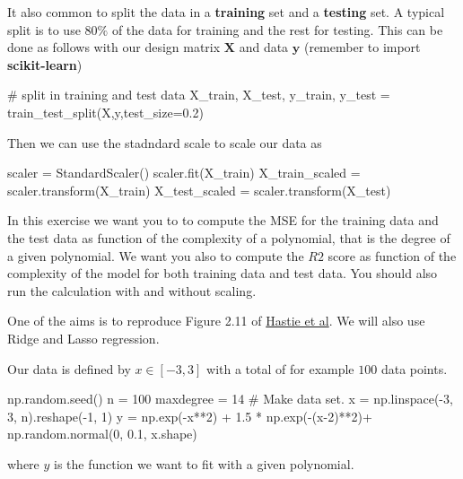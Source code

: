 \documentclass[%
oneside,                 %
final,                   %
10pt]{article}
\begin{document}
It also common to split the data in a \textbf{training} set and a \textbf{testing} set. A typical split is to use $80\%$ of the data for training and the rest
for testing. This can be done as follows with our design matrix $\bm{X}$ and data $\bm{y}$ (remember to import \textbf{scikit-learn})
\begin{print}
# split in training and test data
X_train, X_test, y_train, y_test = train_test_split(X,y,test_size=0.2)
\end{print}
Then we can use the stadndard scale to scale our data as
\begin{print}
scaler = StandardScaler()
scaler.fit(X_train)
X_train_scaled = scaler.transform(X_train)
X_test_scaled = scaler.transform(X_test)
\end{print}


In this exercise we want you to to compute the MSE for the training
data and the test data as function of the complexity of a polynomial,
that is the degree of a given polynomial. We want you also to compute the $R2$ score as function of the complexity of the model for both training data and test data.  You should also run the calculation with and without scaling. 

One of 
the aims is to reproduce Figure 2.11 of \href{{https://github.com/CompPhysics/MLErasmus/blob/master/doc/Textbooks/elementsstat.pdf}}{Hastie et al}.
We will also use Ridge and Lasso regression. 


Our data is defined by $x\in [-3,3]$ with a total of for example $100$ data points.
\begin{print}
np.random.seed()
n = 100
maxdegree = 14
# Make data set.
x = np.linspace(-3, 3, n).reshape(-1, 1)
y = np.exp(-x**2) + 1.5 * np.exp(-(x-2)**2)+ np.random.normal(0, 0.1, x.shape)
\end{print}
where $y$ is the function we want to fit with a given polynomial.
\end{document}
